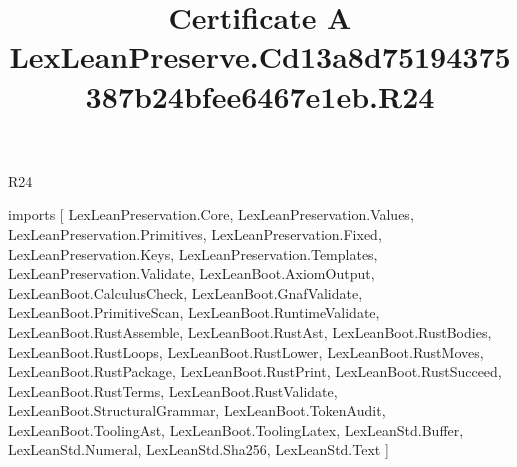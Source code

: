 \begin{lexlean}{R24}
\title{Certificate A LexLeanPreserve.Cd13a8d75194375387b24bfee6467e1eb.R24}
\begin{coremodule}
imports [
  LexLeanPreservation.Core,
  LexLeanPreservation.Values,
  LexLeanPreservation.Primitives,
  LexLeanPreservation.Fixed,
  LexLeanPreservation.Keys,
  LexLeanPreservation.Templates,
  LexLeanPreservation.Validate,
  LexLeanBoot.AxiomOutput,
  LexLeanBoot.CalculusCheck,
  LexLeanBoot.GnafValidate,
  LexLeanBoot.PrimitiveScan,
  LexLeanBoot.RuntimeValidate,
  LexLeanBoot.RustAssemble,
  LexLeanBoot.RustAst,
  LexLeanBoot.RustBodies,
  LexLeanBoot.RustLoops,
  LexLeanBoot.RustLower,
  LexLeanBoot.RustMoves,
  LexLeanBoot.RustPackage,
  LexLeanBoot.RustPrint,
  LexLeanBoot.RustSucceed,
  LexLeanBoot.RustTerms,
  LexLeanBoot.RustValidate,
  LexLeanBoot.StructuralGrammar,
  LexLeanBoot.TokenAudit,
  LexLeanBoot.ToolingAst,
  LexLeanBoot.ToolingLatex,
  LexLeanStd.Buffer,
  LexLeanStd.Numeral,
  LexLeanStd.Sha256,
  LexLeanStd.Text
]


\end{coremodule}
\end{lexlean}
